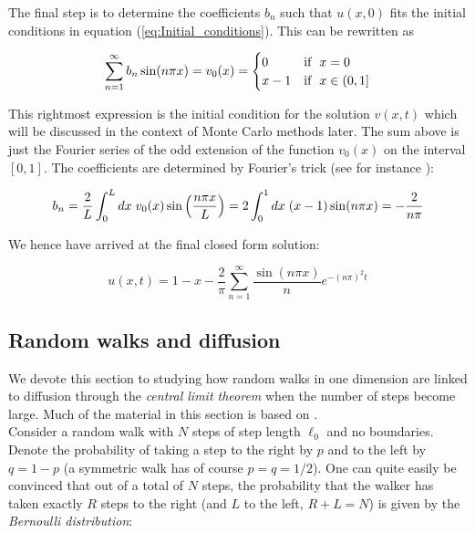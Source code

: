 \documentclass[a4paper, 11pt, notitlepage,english]{article}
\begin{document}
The final step is to determine the coefficients $b_n$ such that $u(x,0)$ fits the initial conditions in equation (\ref{eq:Initial_conditions}). This can be rewritten as 

\begin{equation}
\sum_{n=1}^{\infty} b_n \sin(n\pi x) = v_0(x) =  \begin{cases} 0 & \mathrm{if} \hspace{2mm} x = 0 \\
x-1 & \mathrm{if} \hspace{2mm} x \in (0,1] \end{cases}
\label{eq:Initial_cond_fit}
\end{equation}

This rightmost expression is the initial condition for the solution $v(x,t)$ which will be discussed in the context of Monte Carlo methods later. The sum above is just the Fourier series of the odd extension of the function $v_0(x)$ on the interval $[0,1]$. The coefficients are determined by Fourier's trick (see for instance \cite{Boas}):

\begin{equation}
b_n = \frac{2}{L}\int_0^L dx \hspace{1mm} v_0(x)\sin\left( \frac{n \pi x}{L}\right) = 2\int_0^1 dx \hspace{1mm} (x-1) \sin(n\pi x) = -\frac{2}{n\pi}
\label{eq:Fourier_trick}
\end{equation}

We hence have arrived at the final closed form solution:

\begin{equation}
\boxed{u(x,t) = 1-x - \frac{2}{\pi} \sum_{n=1}^{\infty} \frac{\sin(n\pi x)}{n} e^{-(n\pi)^2t}}
\label{eq:Final_solution}
\end{equation}

\subsection{Random walks and diffusion}
\label{sec:RW}
We devote this section to studying how random walks in one dimension are linked to diffusion through the \emph{central limit theorem} when the number of steps become large. Much of the material in this section is based on \cite{Komp4130}. \\ 

Consider a random walk with $N$ steps of step length $\ell_0$ and no boundaries. Denote the probability of taking a step to the right by $p$ and to the left by $q = 1-p$
(a symmetric walk has of course $p=q=1/2$). One can quite easily be convinced that out of a total of $N$ steps, the probability that the walker has taken exactly $R$ steps 
to the right (and $L$ to the left, $R+L = N$) is given by the \emph{Bernoulli distribution}:
\end{document}
